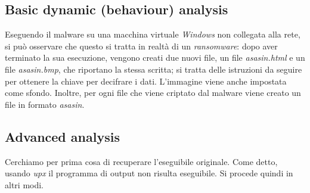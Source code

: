 \documentclass[a4paper, 12pt]{article}
\newcommand{\win}{\textit{Windows}}
\begin{document}
\subsection{Basic dynamic (behaviour) analysis}
Eseguendo il malware su una macchina virtuale \win{} non collegata alla rete, si può osservare che questo si tratta in realtà di un \textit{ransomware}: dopo aver terminato la sua esecuzione, vengono creati due nuovi file, un file \textit{asasin.html} e un file \textit{asasin.bmp}, che riportano la stessa scritta; si tratta delle istruzioni da seguire per ottenere la chiave per decifrare i dati. L'immagine viene anche impostata come sfondo. Inoltre, per ogni file che viene criptato dal malware viene creato un file in formato \textit{asasin}.

\subsection{Advanced analysis}
Cerchiamo per prima cosa di recuperare l'eseguibile originale. Come detto, usando \textit{upx} il programma di output non risulta eseguibile. Si procede quindi in altri modi.
\end{document}

